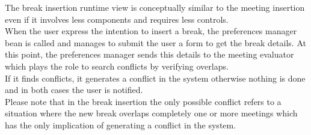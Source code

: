 The break insertion runtime view is conceptually similar to the meeting insertion even if it involves less components and requires less controls. \\
When the user express the intention to insert a break, the preferences manager bean is called and manages to submit the user a form to get the break details. At this point, the preferences manager sends this details to the meeting evaluator which plays the role to search conflicts by verifying overlaps.\\ If it finds conflicts, it generates a conflict in the system otherwise nothing is done and in both cases the user is notified. \\ Please note that in the break insertion the only possible conflict refers to a situation where the new break overlaps completely one or more meetings which has the only implication of generating a conflict in the system. \\